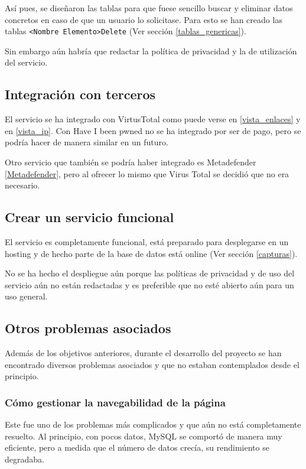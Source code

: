 Así pues, se diseñaron las tablas para que fuese sencillo buscar y eliminar datos concretos en caso de que un usuario lo solicitase. Para esto se han creado las tablas \texttt{<Nombre Elemento>Delete} (Ver sección \ref{tablas_genericas}). 

Sin embargo aún habría que redactar la política de privacidad y la de utilización del servicio. 

\subsection{Integración con terceros}
El servicio se ha integrado con VirtusTotal como puede verse en \ref{vista_enlaces} y en \ref{vista_ip}. Con Have I been pwned no se ha integrado por ser de pago, pero se podría hacer de manera similar en un futuro.

Otro servicio que también se podría haber integrado es Metadefender \ref{Metadefender}, pero al ofrecer lo mismo que Virus Total se decidió que no era necesario. 

\subsection{Crear un servicio funcional}
El servicio es completamente funcional, está preparado para desplegarse en un hosting y de hecho parte de la base de datos está online (Ver sección \ref{capturas}).

No se ha hecho el despliegue aún porque las políticas de privacidad y de uso del servicio aún no están redactadas y  es preferible que no esté abierto aún para un uso general. 

\subsection{Otros problemas asociados}
Además de los objetivos anteriores, durante el desarrollo del proyecto se han encontrado diversos problemas asociados y que no estaban contemplados desde el principio.

\subsubsection{Cómo gestionar la navegabilidad de la página}
Este fue uno de los problemas más complicados y que aún no está completamente resuelto. Al principio, con pocos datos, MySQL se comportó de manera muy eficiente, pero a medida que el número de datos crecía, su rendimiento se degradaba. 

